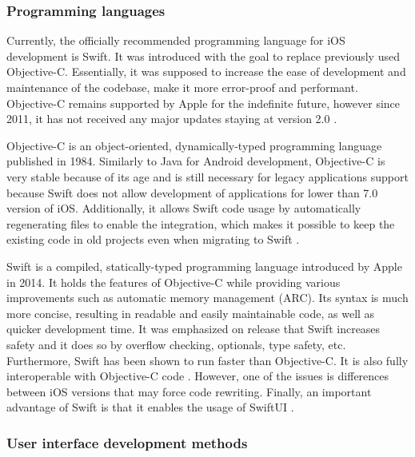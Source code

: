 \subsubsection*{Programming languages}

Currently, the officially recommended programming language for iOS development is Swift. It was introduced with the goal to replace previously used Objective-C. Essentially, it was supposed to increase the ease of development and maintenance of the codebase, make it more error-proof and performant. Objective-C remains supported by Apple for the indefinite future, however since 2011, it has not received any major updates staying at version 2.0 \cite{swift_overview,speed_performance_swift_objective_c,swift_vs_objective_c,wiki_objective_c}.

Objective-C is an object-oriented, dynamically-typed programming language published in 1984. Similarly to Java for Android development, Objective-C is very stable because of its age and is still necessary for legacy applications support because Swift does not allow development of applications for lower than 7.0 version of iOS. Additionally, it allows Swift code usage by automatically regenerating files to enable the integration, which makes it possible to keep the existing code in old projects even when migrating to Swift \cite{swift_objective_c_new_language,geeks_objective_c_swift}.

Swift is a compiled, statically-typed programming language introduced by Apple in 2014. It holds the features of Objective-C while providing various improvements such as automatic memory management (ARC). Its syntax is much more concise, resulting in readable and easily maintainable code, as well as quicker development time. It was emphasized on release that Swift increases safety and it does so by overflow checking, optionals, type safety, etc. Furthermore, Swift has been shown to run faster than Objective-C. It is also fully interoperable with Objective-C code \cite{swift_overview,swift_objective_c_new_language,geeks_objective_c_swift}. However, one of the issues is differences between iOS versions that may force code rewriting. Finally, an important advantage of Swift is that it enables the usage of SwiftUI \cite{comparison_technologies_multiplatform}.

\subsubsection*{User interface development methods}

